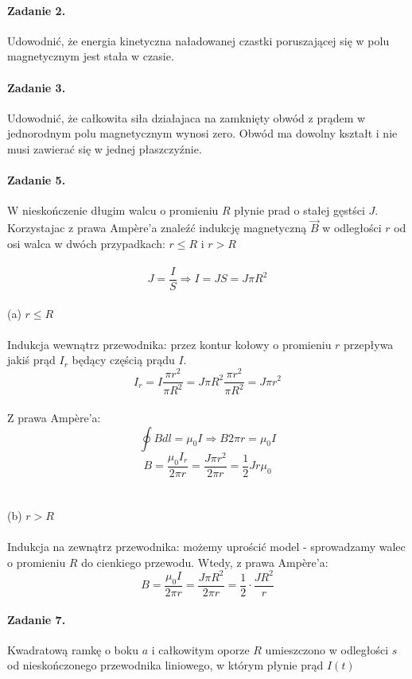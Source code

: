 \documentclass[14pt, table]{extarticle}
\begin{document}
\newpage
\paragraph{Zadanie 2.}
Udowodnić, że energia kinetyczna naładowanej czastki poruszającej się w polu magnetycznym jest stała w czasie.


\newpage
\paragraph{Zadanie 3.}
Udowodnić, że całkowita siła działajaca na zamknięty obwód z prądem w jednorodnym polu magnetycznym wynosi zero. Obwód ma dowolny kształt i nie musi zawierać się w jednej płaszczyźnie. 


\newpage
\paragraph{Zadanie 5.}
W nieskończenie długim walcu o promieniu $R$ płynie prad o stałej gęstści $J$. Korzystajac z prawa Ampère’a znaleźć indukcję magnetyczną $\vec{B}$ w odległości $r$ od osi walca w dwóch przypadkach: $r \leq R$ i $r > R$\\ \\
$$ J = \frac{I}{S} \Rightarrow I = JS = J \pi R^2 $$ \\ 
(a) $r \leq R$ \\ \\
Indukcja wewnątrz przewodnika: przez kontur kołowy o promieniu $r$ przepływa jakiś prąd $I_r$ będący częścią prądu $I$. \\
$$ I_r = I \frac{\pi r^2}{\pi R^2} = J \pi R^2 \frac{\pi r^2}{\pi R^2} = J \pi r^2 $$ \\
Z prawa Ampère’a:
$$ \oint B dl = \mu_0 I \Rightarrow B2 \pi r = \mu_0 I$$
$$ B = \frac{\mu_0 I_r}{2 \pi r} = \frac{J \pi r^2}{2 \pi r} = \frac{1}{2} J r \mu_0 $$ \\ \\
(b) $r > R$ \\ \\
Indukcja na zewnątrz przewodnika: możemy uprościć model - sprowadzamy walec o promieniu $R$ do cienkiego przewodu. Wtedy, z prawa Ampère’a:
$$ B = \frac{\mu_0 I}{2 \pi r} = \frac{J \pi R^2}{2 \pi r} = \frac{1}{2} \cdot \frac{J R^2}{r}$$ 


\newpage
\paragraph{Zadanie 7.}
Kwadratową ramkę o boku $a$ i całkowitym oporze $R$ umieszczono w odległości $s$ od
nieskończonego przewodnika liniowego, w którym płynie prąd $I(t)$
\end{document}

